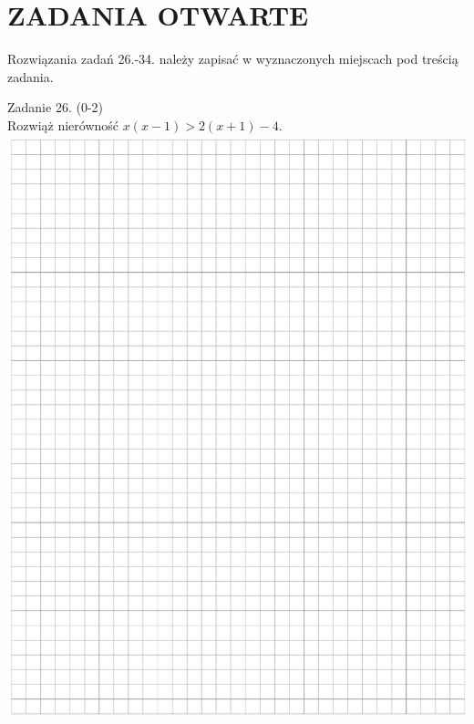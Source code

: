 \documentclass[10pt]{article}
\begin{document}
\section*{ZADANIA OTWARTE}
Rozwiązania zadań 26.-34. należy zapisać w wyznaczonych miejscach pod treścią zadania.

Zadanie 26. (0-2)\\
Rozwiąż nierówność \(x(x-1)>2(x+1)-4\).\\
\includegraphics[max width=\textwidth, center]{2024_11_21_99eb8e6624b497a5af43g-10}
\end{document}

